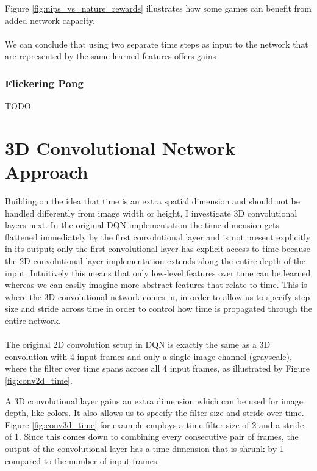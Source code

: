 Figure \ref{fig:nips_vs_nature_rewards}
illustrates how some games can benefit
from added network capacity.

\paragraph{}
We can conclude that using two separate time steps
as input to the network
that are represented by the same learned features
offers gains

\subsubsection{Flickering Pong}
TODO

\section{3D Convolutional Network Approach}
\label{sec:3d_convolutional_network_approach}
Building on the idea that time is an extra spatial dimension
and should not be handled differently
from image width or height,
I investigate 3D convolutional layers next.
In the original DQN implementation
the time dimension gets flattened immediately
by the first convolutional layer
and is not present explicitly
in its output;
only the first convolutional layer
has explicit access to time
because the 2D convolutional layer implementation
extends along the entire depth of the input.
Intuitively this means that only low-level
features over time can be learned
whereas we can easily imagine
more abstract features
that relate to time.
This is where the 3D convolutional network comes in,
in order to allow us to specify step size and stride across time
in order to control how time is propagated through the entire network.

\paragraph{}
The original 2D convolution setup in DQN
is exactly the same as a 3D convolution
with 4 input frames and only a single image channel (grayscale),
where the filter over time spans across all 4 input frames,
as illustrated by Figure \ref{fig:conv2d_time}.

A 3D convolutional layer gains an extra dimension
which can be used for image depth, like colors.
It also allows us to specify the filter size and stride over time.
Figure \ref{fig:conv3d_time} for example
employs a time filter size of 2 and a stride of 1.
Since this comes down to combining every consecutive pair of frames,
the output of the convolutional layer has a time dimension
that is shrunk by 1 compared to the number of input frames.

